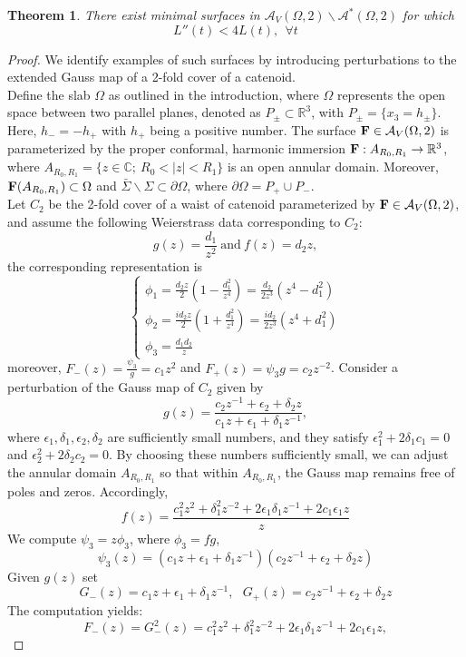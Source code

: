 \documentclass[11pt]{amsart}
\numberwithin{equation}{section}
\theoremstyle{theorem}
\newtheorem{theorem}{Theorem}[section]
\theoremstyle{definition}
\numberwithin{equation}{section}
\begin{document}
\begin{theorem} \label{thm: existence for L''<4L}
    There exist minimal surfaces in $\mathcal{A}_V(\Omega,2)\backslash \mathcal{A}^*(\Omega,2)$ for which
    $$
    L''(t)<4L(t),\ \ \forall t
    $$
\end{theorem}
\begin{proof}
    We identify examples of such surfaces by introducing perturbations to the extended Gauss map of a 2-fold cover of a catenoid.\\
 Define the slab $\Omega$ as outlined in the introduction, where $\Omega$ represents the open space between two parallel planes, denoted as $P_{\pm} \subset \mathbb{R}^3$, with $P_{\pm} =\{ x_3 =h_{\pm} \}$. Here, $h_-=-h_+$ with $h_+$ being a positive number. The surface $\bold{F} \in \mathcal{A}_V(\Omega ,2)$ is parameterized by the proper conformal, harmonic immersion $\bold{F}:A_{R_0,R_1} \rightarrow \mathbb{R}^3$, where $A_{R_0,R_1}=\{ z\in \mathbb{C} ;\  R_0< \vert z\vert <R_1 \}$ is an open annular domain. Moreover, $\bold{F}(A_{R_0,R_1}) \subset \Omega$ and $\bar{\Sigma} \backslash \Sigma \subset \partial \Omega$, where $\partial \Omega =  P_+ \cup P_- $. \\
Let $C_2$ be the 2-fold cover of a waist of catenoid parameterized by $\bold{F} \in \mathcal{A}_V(\Omega , 2)$, and assume the following Weierstrass data corresponding to $C_2$:
     $$
     g(z)=\frac{d_1}{z^2} \ \text{and}\ f(z)=d_2z,
     $$
     the corresponding representation is
     $$
     \begin{cases}
         \phi_1 = \frac{d_2z}{2} (1-\frac{d_1^2}{z^4})=\frac{d_2}{2z^3}(z^4-d_1^2) \\
         \phi_2 = \frac{id_2z}{2} (1+\frac{d_1^2}{z^4})=\frac{id_2}{2z^3}(z^4+d_1^2)  \\
         \phi_3 = \frac{d_1d_2}{z}
     \end{cases}
     $$
moreover, $F_-(z)=\frac{\psi_3}{g}=c_1z^2$ and $F_+(z)=\psi_3 g=c_2z^{-2}$.
Consider a perturbation of the Gauss map of $C_2$ given by
    $$
    g(z)=\frac{c_2 z^{-1}+\epsilon_2 +\delta_2 z}{c_1z+\epsilon_1 + \delta_1 z^{-1}},
    $$
   where $\epsilon_1, \delta_1, \epsilon_2, \delta_2$ are sufficiently small numbers, and they satisfy $\epsilon_1^2+2\delta_1c_1=0$ and $\epsilon_2^2+2\delta_2 c_2=0$. 
   By choosing these numbers sufficiently small, we can adjust the annular domain $A_{R_0,R_1}$ so that within $A_{R_0,R_1}$, the Gauss map remains free of poles and zeros. Accordingly,
   $$  f(z)=\frac{c_1^2z^2+\delta_1^2z^{-2}+2\epsilon_1 \delta_1 z^{-1}+2c_1\epsilon_1z}{z}
    $$
We compute $\psi_3 =z\phi_3$, where $\phi_3=fg$,
$$
\psi_3 (z) = (c_1z+\epsilon_1 + \delta_1 z^{-1}) (c_2 z^{-1}+\epsilon_2 +\delta_2 z)
$$
Given $g(z)$ set
    $$
    G_-(z)= c_1z+\epsilon_1 + \delta_1 z^{-1},\ \ \  G_+(z)=c_2 z^{-1}+\epsilon_2 +\delta_2 z 
    $$
    The computation yields:
    $$
    F_-(z)=G_-^2(z)=c_1^2z^2+\delta_1^2z^{-2}+2\epsilon_1 \delta_1 z^{-1}+2c_1\epsilon_1z,
    $$
   

\end{proof}
\end{document}
